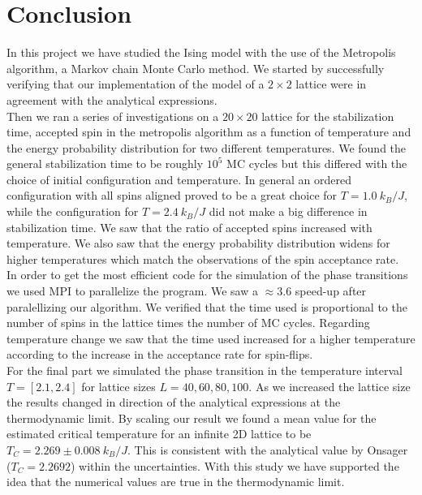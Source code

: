 \documentclass[%
 reprint,
nofootinbib,
aps,
]{revtex4-1}
\begin{document}
\section{Conclusion}
In this project we have studied the Ising model with the use of the Metropolis algorithm, a Markov chain Monte Carlo method. We started by successfully verifying that our implementation of the model of a $2 \times 2$ lattice were in agreement with the analytical expressions.\\
Then we ran a series of investigations on a $20\times20$ lattice for the stabilization time, accepted spin in the metropolis algorithm as a function of temperature and the energy probability distribution for two different temperatures. We found the general stabilization time to be roughly $10^5$ MC cycles but this differed with the choice of initial configuration and temperature. In general an ordered configuration with all spins aligned proved to be a great choice for $T =1.0 \ k_B/J$, while the configuration for $T = 2.4 \ k_B/J$ did not make a big difference in stabilization time. We saw that the ratio of accepted spins increased with temperature. We also saw that the energy probability distribution widens for higher temperatures which match the observations of the spin acceptance rate.\\ 
In order to get the most efficient code for the simulation of the phase transitions we used MPI to parallelize the program. We saw a $\approx 3.6$ speed-up after paralellizing our algorithm. We verified that the time used is proportional to the number of spins in the lattice times the number of MC cycles. Regarding temperature change we saw that the time used increased for a higher temperature according to the increase in the acceptance rate for spin-flips.\\
For the final part we simulated the phase transition in the temperature interval $T = [2.1, 2.4]$ for lattice sizes $L = 40, 60, 80, 100$. As we increased the lattice size the results changed in direction of the analytical expressions at the thermodynamic limit. By scaling our result we found a mean value for the estimated critical temperature for an infinite 2D lattice to be $T_C = 2.269 \pm 0.008 \ k_B/J$. This is consistent with the analytical value by Onsager ($T_C = 2.2692$) within the uncertainties. With this study we have supported the idea that the numerical values are true in the thermodynamic limit.
\end{document}

